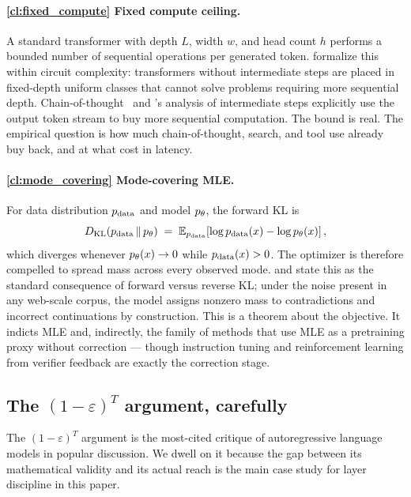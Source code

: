 \paragraph{\ref{cl:fixed_compute} Fixed compute ceiling.}
A standard transformer with depth $L$, width $w$, and head count $h$ performs a bounded number of sequential operations per generated token.
\citet{merrill2023parallelism,strobl2024transformer} formalize this within circuit complexity: transformers without intermediate steps are placed in fixed-depth uniform classes that cannot solve problems requiring more sequential depth.
Chain-of-thought~\citep{wei2022chain} and \citet{feng2023towards}'s analysis of intermediate steps explicitly use the output token stream to buy more sequential computation.
The bound is real.
The empirical question is how much chain-of-thought, search, and tool use already buy back, and at what cost in latency.

\paragraph{\ref{cl:mode_covering} Mode-covering MLE.}
For data distribution $p_{\mathrm{data}}$ and model $p_\theta$, the forward KL is
\begin{equation}
  D_{\mathrm{KL}}(p_{\mathrm{data}} \,\|\, p_\theta)
  \;=\; \mathbb{E}_{p_{\mathrm{data}}}\!\left[\log p_{\mathrm{data}}(x) - \log p_\theta(x)\right],
\end{equation}
which diverges whenever $p_\theta(x) \to 0$ while $p_{\mathrm{data}}(x) > 0$.
The optimizer is therefore compelled to spread mass across every observed mode.
\citet{theis2016note} and \citet{minka2005divergence} state this as the standard consequence of forward versus reverse KL;
under the noise present in any web-scale corpus, the model assigns nonzero mass to contradictions and incorrect continuations by construction.
This is a theorem about the objective.
It indicts MLE and, indirectly, the family of methods that use MLE as a pretraining proxy without correction --- though instruction tuning and reinforcement learning from verifier feedback are exactly the correction stage.

\subsection{The $(1-\varepsilon)^T$ argument, carefully}
\label{ssec:compounding}

The $(1-\varepsilon)^T$ argument is the most-cited critique of autoregressive language models in popular discussion.
We dwell on it because the gap between its mathematical validity and its actual reach is the main case study for layer discipline in this paper.


